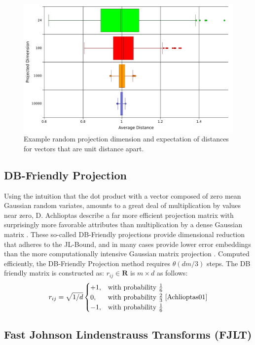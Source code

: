 \begin{figure}
    \centerline{\includegraphics[width=.9\textwidth]{figs/projectiondimensionVSaveragedistance}}
    \caption[Experiment with Random Projection and Distance]{Example random projection dimension and expectation of distances for vectors that are unit distance
      apart.}\label{projex} 
\end{figure}

\subsection{DB-Friendly Projection}
Using the intuition that the dot product with a vector composed of zero mean Gaussian random variates, amounts to a
great deal of multiplication by values near zero, D. Achlioptas describe a far more efficient projection matrix with
surprisingly more favorable attributes than multiplication by a dense Gaussian matrix \cite{Achlioptas01}.  
These so-called DB-Friendly projections provide dimensional reduction that adheres to the JL-Bound, and in many cases
provide lower error embeddings than the more computationally intensive Gaussian matrix projection \cite{Achlioptas01}. 
Computed efficiently, the DB-Friendly Projection method requires $\theta(dm/3 )$ steps.
The DB friendly matrix is constructed as: $r_{ij}\in\textbf{R}$ is $m\times d$ as follows:
\[
    r_{ij}= \sqrt{1/d}
\begin{cases}
    +1, & \text{with probability } {\frac{1}{6}}\\
     0, & \text{with probability } {\frac{2}{3}}\\
    -1, & \text{with probability } {\frac{1}{6}}\\
\end{cases}\text{\cite{Achlioptas01}}
\]

\subsection{Fast Johnson Lindenstrauss Transforms (FJLT)}

